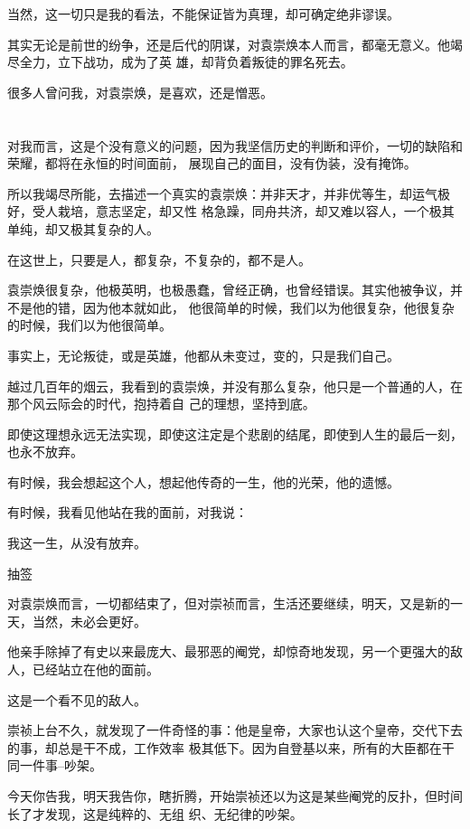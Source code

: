 \documentclass[11pt,a4paper,onecolumn]{article}
\begin{document}
当然，这一切只是我的看法，不能保证皆为真理，却可确定绝非谬误。

其实无论是前世的纷争，还是后代的阴谋，对袁崇焕本人而言，都毫无意义。他竭尽全力，立下战功，成为了英
雄，却背负着叛徒的罪名死去。

很多人曾问我，对袁崇焕，是喜欢，还是憎恶。

\section[\thesection]{}

对我而言，这是个没有意义的问题，因为我坚信历史的判断和评价，一切的缺陷和荣耀，都将在永恒的时间面前，
展现自己的面目，没有伪装，没有掩饰。

所以我竭尽所能，去描述一个真实的袁崇焕：并非天才，并非优等生，却运气极好，受人栽培，意志坚定，却又性
格急躁，同舟共济，却又难以容人，一个极其单纯，却又极其复杂的人。

在这世上，只要是人，都复杂，不复杂的，都不是人。

袁崇焕很复杂，他极英明，也极愚蠢，曾经正确，也曾经错误。其实他被争议，并不是他的错，因为他本就如此，
他很简单的时候，我们以为他很复杂，他很复杂的时候，我们以为他很简单。

事实上，无论叛徒，或是英雄，他都从未变过，变的，只是我们自己。

越过几百年的烟云，我看到的袁崇焕，并没有那么复杂，他只是一个普通的人，在那个风云际会的时代，抱持着自
己的理想，坚持到底。

即使这理想永远无法实现，即使这注定是个悲剧的结尾，即使到人生的最后一刻，也永不放弃。

有时候，我会想起这个人，想起他传奇的一生，他的光荣，他的遗憾。

有时候，我看见他站在我的面前，对我说：

我这一生，从没有放弃。

抽签

对袁崇焕而言，一切都结束了，但对崇祯而言，生活还要继续，明天，又是新的一天，当然，未必会更好。

他亲手除掉了有史以来最庞大、最邪恶的阉党，却惊奇地发现，另一个更强大的敌人，已经站立在他的面前。

这是一个看不见的敌人。

崇祯上台不久，就发现了一件奇怪的事：他是皇帝，大家也认这个皇帝，交代下去的事，却总是干不成，工作效率
极其低下。因为自登基以来，所有的大臣都在干同一件事--吵架。

今天你告我，明天我告你，瞎折腾，开始崇祯还以为这是某些阉党的反扑，但时间长了才发现，这是纯粹的、无组
织、无纪律的吵架。
\end{document}
